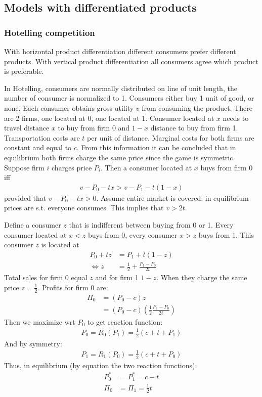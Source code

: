 \subsection{Models with differentiated products}
\subsubsection{Hotelling competition}
With horizontal product differentiation different consumers prefer different products. With
vertical product differentiation all consumers agree which product is preferable.

In Hotelling, consumers are normally distributed on line of unit length, the number of consumer
is normalized to 1. Consumers either buy 1 unit of good, or none. Each consumer obtains gross
utility $v$ from consuming the product. There are 2 firms, one located at 0, one located at 1.
Consumer located at $x$ needs to travel distance $x$ to buy from firm 0 and $1-x$ distance to
buy from firm 1. Transportation costs are $t$ per unit of distance. Marginal costs for both firms
are constant and equal to $c$. From this information it can be concluded that in equilibrium both
firms charge the same price since the game is symmetric.
Suppose firm $i$ charges price $P_i$. Then a consumer located at $x$ buys from firm 0 iff
\begin{align}
	v-P_0-tx>v-P_1-t(1-x)
\end{align}
provided that $v-P_0-tx>0$. Assume entire market is covered: in equilibrium prices are s.t.
everyone consumes. This implies that $v>2t$.

Define a consumer $z$ that is indifferent between buying from 0 or 1. Every consumer located at
$x<z$ buys from 0, every consumer $x>z$ buys from 1. This consumer $z$ is located at
\begin{align}
	P_0+tz                & =P_1+t(1-z)                     \\
	\Longleftrightarrow z & =\frac{1}{2}+\frac{P_1-P_0}{2t}
\end{align}
Total sales for firm 0 equal $z$ and for firm 1 $1-z$. When they charge the same price
$z=\frac{1}{2}$. Profits for firm 0 are:
\begin{align}
	\Pi_0 & = (P_0-c)z                                         \\
	      & =(P_0-c)\left(\frac{1}{2}\frac{P_1-P_0}{2t}\right)
\end{align}
Then we maximize wrt $P_0$ to get reaction function:
\begin{align}
	P_0=R_0(P_1)=\frac{1}{2}(c+t+P_1)
\end{align}
And by symmetry:
\begin{align}
	P_1=R_1(P_0)=\frac{1}{2}(c+t+P_0)
\end{align}
Thus, in equilibrium (by equation the two reaction functions):
\begin{align}
	P_0^* & =P_1^*=c+t          \\
	\Pi_0 & =\Pi_1=\frac{1}{2}t
\end{align}
